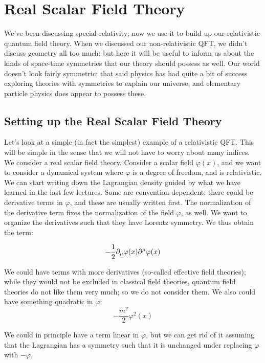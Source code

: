\section{Real Scalar Field Theory}
We've been discussing special relativity; now we use it to build up our relativistic quantum field theory. When we discussed our non-relativistic QFT, we didn't discuss geometry all too much; but here it will be useful to inform us about the kinds of space-time symmetries that our theory should possess as well. Our world doesn't look fairly symmetric; that said physics has had quite a bit of success exploring theories with symmetries to explain our universe; and elementary particle physics does appear to possess these.

\subsection{Setting up the Real Scalar Field Theory}

Let's look at a simple (in fact the simplest) example of a relativistic QFT. This will be simple in the sense that we will not have to worry about many indices. We consider a real scalar field theory. Consider a scalar field $\varphi(x)$, and we want to consider a dynamical system where $\varphi$ is a degree of freedom, and is relativistic. We can start writing down the Lagrangian density guided by what we have learned in the last few lectures. Some are convention dependent; there could be derivative terms in $\varphi$, and these are usually written first. The normalization of the derivative term fixes the normalization of the field $\varphi$, as well. We want to organize the derivatives such that they have Lorentz symmetry. We thus obtain the term:

\begin{equation}
    -\frac{1}{2}\p_\mu \varphi(x)\p^\mu \varphi(x)
\end{equation}

We could have terms with more derivatives (so-called effective field theories); while they would not be excluded in classical field theories, quantum field theories do not like them very much; so we do not consider them. We also could have something quadratic in $\varphi$:
\begin{equation}
    -\frac{m^2}{2}\varphi^2(x)
\end{equation}

We could in principle have a term linear in $\varphi$, but we can get rid of it assuming that the Lagrangian has a symmetry such that it is unchanged under replacing $\varphi$ with $-\varphi$.

